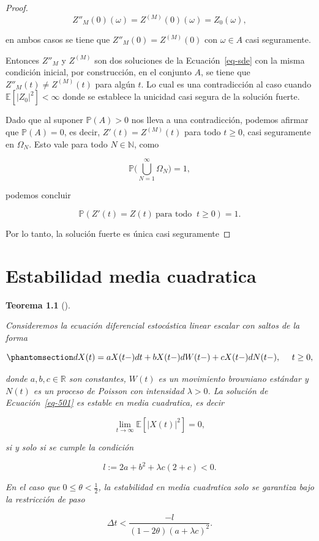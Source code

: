 \documentclass[
  spanish,
  us-letterpaper,
]{scrreprt}
\theoremstyle{plain}
\newtheorem{theorem}{Teorema}[chapter]
\theoremstyle{plain}
\theoremstyle{plain}
\theoremstyle{definition}
\theoremstyle{remark}
\begin{document}
\begin{proof}
\[
    Z''_M(0)(\omega)=Z^{(M)}(0)(\omega)=Z_0(\omega),
\]

en ambos casos se tiene que \(Z''_M(0)=Z^{(M)}(0)\) con \(\omega\in A\)
casi seguramente.

Entonces \(Z''_M\) y \(Z^{(M)}\) son dos soluciones de la
Ecuación~\ref{eq-sde} con la misma condición inicial, por construcción,
en el conjunto \(A\), se tiene que \(Z''_M(t)\neq Z^{(M)}(t)\) para
algún \(t\). Lo cual es una contradicción al caso cuando
\(\mathbb{E}[|Z_0|^2]<\infty\) donde se establece la unicidad casi
segura de la solución fuerte.

Dado que al suponer \(\mathbb{P}(A)>0\) nos lleva a una contradicción,
podemos afirmar que \(\mathbb{P}(A)=0\), es decir, \(Z'(t)=Z^{(M)}(t)\)
para todo \(t\geq 0\), casi seguramente en \(\Omega_N\). Esto vale para
todo \(N\in \mathbb{N}\), como

\[
    \mathbb{P}\Bigg(\bigcup\limits_{N=1}^{\infty}\Omega_N\Bigg)=1,
\]

podemos concluir

\[
    \mathbb{P}(Z'(t)=Z(t)\ \text{para todo }\ t\geq 0)=1.
\]

Por lo tanto, la solución fuerte es única casi seguramente
\end{proof}


\chapter{Estabilidad media
cuadratica}\label{estabilidad-media-cuadratica}

\begin{theorem}[]\protect\hypertarget{thm-varmues}{}\label{thm-varmues}

Consideremos la ecuación diferencial estocástica linear escalar con
saltos de la forma

\begin{equation}\phantomsection\label{eq-501}{
    dX(t) = aX(t-)dt+bX(t-)dW(t-)+cX(t-)dN(t-), \ \ \ \ t\geq 0,
}\end{equation}

donde \(a,b,c\in \mathbb{R}\) son constantes, \(W(t)\) es un movimiento
browniano estándar y \(N(t)\) es un proceso de Poisson con intensidad
\(\lambda>0\). La solución de Ecuación~\ref{eq-501} es estable en media
cuadratica, es decir

\[
    \lim\limits_{t\rightarrow \infty}\mathbb{E}[|X(t)|^2]=0,
\]

si y solo si se cumple la condición

\[
    l:=2a+b^2+\lambda c(2+c)<0.
\]

En el caso que \(\displaystyle 0\leq \theta< \frac{1}{2}\), la
estabilidad en media cuadratica solo se garantiza bajo la restricción de
paso

\[
    \Delta t<\frac{-l}{(1-2\theta)(a+\lambda c)^2}.
\]

\end{theorem}
\end{document}
